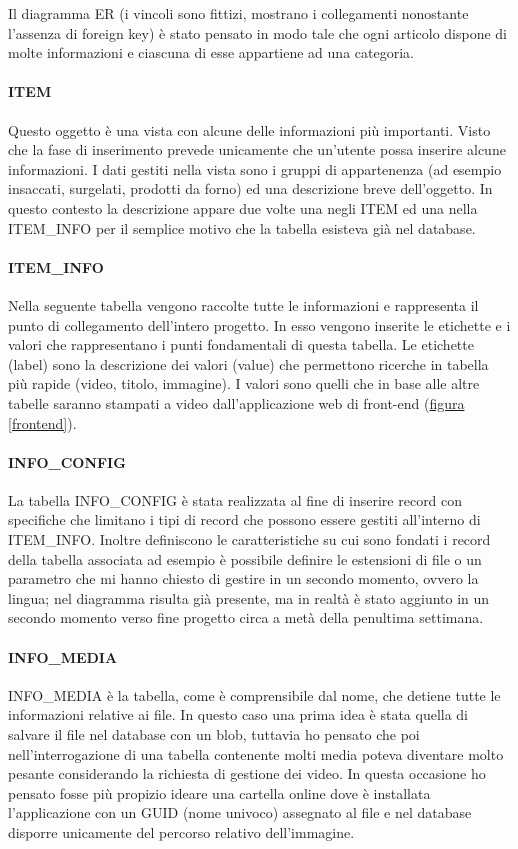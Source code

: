 Il diagramma ER (i vincoli sono fittizi, mostrano i collegamenti nonostante l'assenza di foreign key) è stato pensato in modo tale che ogni articolo dispone di molte informazioni e ciascuna di esse appartiene ad una categoria.

\paragraph{ITEM}
Questo oggetto è una vista con alcune delle informazioni più importanti. Visto che la fase di inserimento prevede unicamente che un'utente possa inserire alcune informazioni. I dati gestiti nella vista sono i gruppi di appartenenza (ad esempio insaccati, surgelati, prodotti da forno) ed una descrizione breve dell'oggetto.
In questo contesto la descrizione appare due volte una negli ITEM ed una nella ITEM\_INFO per il semplice motivo che la tabella esisteva già nel database.

\paragraph{ITEM\_INFO}
Nella seguente tabella vengono raccolte tutte le informazioni e rappresenta il punto di collegamento dell'intero progetto. In esso vengono inserite le etichette e i valori che rappresentano i punti fondamentali di questa tabella. Le etichette (label) sono la descrizione dei valori (value) che permettono ricerche in tabella più rapide (video, titolo, immagine). I valori sono quelli che in base alle altre tabelle saranno stampati a video dall'applicazione web di front-end (\hyperref[frontend]{figura \ref{frontend}}).

\paragraph{INFO\_CONFIG}
La tabella INFO\_CONFIG è stata realizzata al fine di inserire record con specifiche che limitano i tipi di record che possono essere gestiti all'interno di ITEM\_INFO. Inoltre definiscono le caratteristiche su cui sono fondati i record della tabella associata ad esempio è possibile definire le estensioni di file o un parametro che mi hanno chiesto di gestire in un secondo momento, ovvero la lingua; nel diagramma risulta già presente, ma in realtà è stato aggiunto in un secondo momento verso fine progetto circa a metà della penultima settimana.

\paragraph{INFO\_MEDIA}
INFO\_MEDIA è la tabella, come è comprensibile dal nome, che detiene tutte le informazioni relative ai file. In questo caso una prima idea è stata quella di salvare il file nel database con un blob, tuttavia ho pensato che poi nell'interrogazione di una tabella contenente molti media poteva diventare molto pesante considerando la richiesta di gestione dei video. In questa occasione ho pensato fosse più propizio ideare una cartella online dove è installata l'applicazione con un GUID (nome univoco) assegnato al file e nel database disporre unicamente del percorso relativo dell'immagine.

